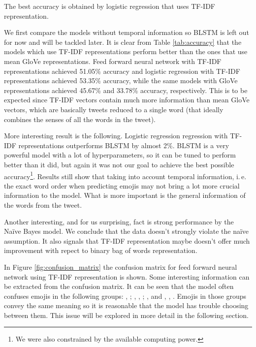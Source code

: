 \documentclass[10pt, a4paper]{article}
\begin{document}
The best accuracy is obtained by logistic regression that uses TF-IDF 
representation.

We first compare the models without temporal information so BLSTM is left out 
for now and will be tackled later. It is clear from Table \ref{tab:accuracy} 
that the models which use TF-IDF representations perform better than the ones 
that use mean GloVe representations. Feed forward neural network with TF-IDF 
representations achieved 51.05\% accuracy and logistic regression with TF-IDF 
representations achieved 53.35\% accuracy, while the same models with GloVe 
representations achieved 45.67\% and 33.78\% accuracy, respectively. This is to 
be expected since TF-IDF vectors contain much more information than mean GloVe 
vectors, which are basically tweets reduced to a single word (that ideally
combines the senses of all the words in the tweet).

More interesting result is the following. Logistic regression regression with 
TF-IDF representations outperforms BLSTM by almost 2\%. BLSTM is a very powerful
model with a lot of hyperparameters, so it can be tuned to perform better than 
it did, but again it was not our goal to achieve the best possible 
accuracy\footnote{We were also constrained by the available computing power.}.
Results still show that taking into account temporal information, i.\,e. the 
exact word order when predicting emojis may not bring a lot more crucial 
information to the model. What is more important is the general information of 
the words from the tweet.

Another interesting, and for us surprising, fact is strong performance by the 
Na\"ive Bayes model. We conclude that the data doesn't strongly violate the 
na\"ive assumption. It also signals that TF-IDF representation maybe doesn't 
offer much improvement with repect to binary bag of words representation.

In Figure \ref{fig:confusion_matrix} the confusion matrix for feed forward 
neural network using TF-IDF representation is shown. Some interesting 
information can be extracted from the confusion matrix. It can be seen that the
model often confuses emojis in the following groups: , 
; , , ; ,
 and , , . Emojis in 
those groups convey the same meaning so it is reasonable that the model has 
trouble choosing between them. This issue will be explored in more detail in the
following section.
    
\end{document}
